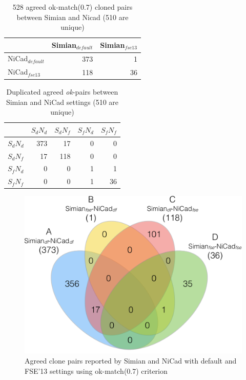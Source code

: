 \documentclass{IEEEtran}
\begin{document}
\begin{table}[h]
	\centering
	\caption{528 agreed ok-match(0.7) cloned pairs between Simian and Nicad (510 are unique)}
	\label{t_agreed_ok_clone_pairs}
	\begin{tabular}{l|r|r}
		\hline
		& Simian$_{\mathrm{\textit{default}}}$ & Simian$_{\mathrm{\textit{fse13}}}$ \\ %
		\hline
		NiCad$_{\mathrm{\textit{default}}}$ & 373 & 1 \\%
		NiCad$_{\mathrm{\textit{fse13}}}$   & 118 & 36 \\ %
		\hline
	\end{tabular}
\end{table}

\begin{table}[h]
	\centering
	\caption{Duplicated agreed \textit{ok}-pairs between Simian and NiCad settings  (510 are unique)}
	\label{t_dup_agreed_ok_clone_pairs}
	\begin{tabular}{l|r|r|r|r}
		\hline
		& $S_dN_d$ & $S_dN_f$ & $S_fN_d$ & $S_fN_f$ \\ %
		\hline
		$S_dN_d$ & 373 & 17 & 0 & 0 \\%
		$S_dN_f$ & 17 & 118 & 0 & 0 \\ %
		$S_fN_d$ & 0 & 0 & 1 & 1 \\
		$S_fN_f$ & 0 & 0 & 1 & 36 \\	
		\hline
	\end{tabular}
\end{table}

\begin{figure}[H]
	\centering
	\includegraphics[width=0.5\linewidth]{venn4_pairs_ok}
	\caption[Agreed clone pairs reported by Simian and NiCad with default and FSE'13 settings using ok-match(0.7) criterion]{Agreed clone pairs reported by Simian and NiCad with default and FSE'13 settings using ok-match(0.7) criterion}
	\label{fig:venn4_pairs}
\end{figure}
\end{document}
